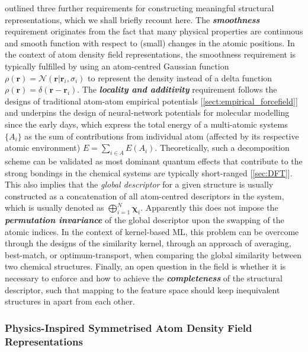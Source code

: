 \citet{musil2021physics} outlined three further requirements for constructing meaningful structural representations, which we shall briefly recount here. The \emph{\textbf{smoothness}} requirement originates from the fact that many physical properties are continuous and smooth function with respect to (small) changes in the atomic positions. In the context of atom density field representations, the smoothness requirement is typically fulfilled by using an atom-centred Gaussian function\cite{bartok2013representing} $\rho(\bm{r})=\mathcal{N}(\bm{r}\vert\bm{r}_i,\sigma_i)$ to represent the density instead of a delta function\cite{drautz2019atomic,shapeev2016moment} $\rho(\bm{r})=\delta(\bm{r}-\bm{r}_{i})$. The \emph{\textbf{locality and additivity}} requirement follows the designs of traditional atom-atom empirical potentials [\cref{sect:empirical_forcefield}] and underpins the design of neural-network potentials for molecular modelling since the early days\cite{behler2011atom,behler2011neural,behler2021four}, which express the total energy of a multi-atomic systems $\{A_i\}$ as the sum of contributions from individual atom (affected by its respective atomic environment\cite{bartok2013representing}) $E=\sum_{i\in A}E(A_i)$. Theoretically, such a decomposition scheme can be validated as most dominant quantum effects that contribute to the strong bondings in the chemical systems are typically short-ranged [\cref{sec:DFT}]. This also implies that the \emph{global descriptor} for a given structure is usually constructed as a concatenation of all atom-centred descriptors in the system, which is usually denoted as $\bigoplus_{i=1}^{N}\boldsymbol{\chi}_{i}$. Apparently this does not impose the \textbf{\emph{permutation invariance}} of the global descriptor upon the swapping of the atomic indices. In the context of kernel-based ML, this problem can be overcome through the designs of the similarity kernel,\cite{de2016comparing} through an approach of averaging, best-match, or optimum-transport, when comparing the global similarity between two chemical structures. Finally, an open question in the field is whether it is necessary to enforce and how to achieve the \emph{\textbf{completeness}} of the structural descriptor, such that mapping to the feature space should keep inequivalent structures in apart from each other.

\subsubsection{Physics-Inspired Symmetrised Atom Density Field Representations}
\label{sec:physics_informed_representation}

